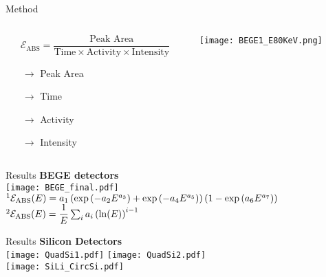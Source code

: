 \documentclass[10pt]{beamer}
\begin{document}
\begin{frame}{Method}
	\begin{columns}
		\begin{column}{0.4\textwidth}
			\begin{overlayarea}{\textwidth}{\textheight}
				\centering
				\small
				\[ \mathcal{E}_{\text{ABS}} = \dfrac{\text{Peak Area}}{\text{Time}\times \text{Activity}\times \text{Intensity}}\]
				\begin{itemize}
					\item[$\rightarrow$] Peak Area
					\item[$\rightarrow$] Time
					\item[$\rightarrow$]	 Activity
					\item[$\rightarrow$] Intensity
				\end{itemize}
			\end{overlayarea}
		\end{column}
		\begin{column}{0.6\textwidth}
			\begin{overlayarea}{\textwidth}{\textheight}
				\centering
				\vspace{0.15\textheight}
				\texttt{[image: BEGE1\_E80KeV.png]}
			\end{overlayarea}
		\end{column}
	\end{columns}
\end{frame}

\begin{frame}{Results}
	\centering
	\vspace{-0.07\textheight}
	\textbf{BEGE detectors}\\
	\vspace{0.01\textheight}
	\texttt{[image: BEGE\_final.pdf]}
	\small
	$\footnote{\tiny Hurtado Garcia-Lenon Nucl. Instr. and Meth. A 594 (2008) 362–367} \mathcal{E}_{\text{ABS}} (E) = a_1 \left(\exp \left(-a_2 E^{a_3}\right)+\exp \left(-a_4 E^{a_5}\right)	\right)\left(1-\exp \left(a_6 E^{a_7}\right)\right) $\\
	$\footnote{\tiny P.W. Gray, A. Ahmad, Nucl. Instr. and Meth. A 237 (1985) 577} \mathcal{E}_{\text{ABS}} (E) = \dfrac{1}{E}\sum_i a_i \left(\ln(E)\right)^{i-1}$
\end{frame}

\begin{frame}{Results}
	\centering
	\vspace{-0.1\textheight}
	\textbf{Silicon Detectors}\\
	\vspace{0.05\textheight}
	\texttt{[image: QuadSi1.pdf]}
	\hspace{0.05\textwidth}
	\texttt{[image: QuadSi2.pdf]}\\
	\texttt{[image: SiLi\_CircSi.pdf]}
\end{frame}
\end{document}
